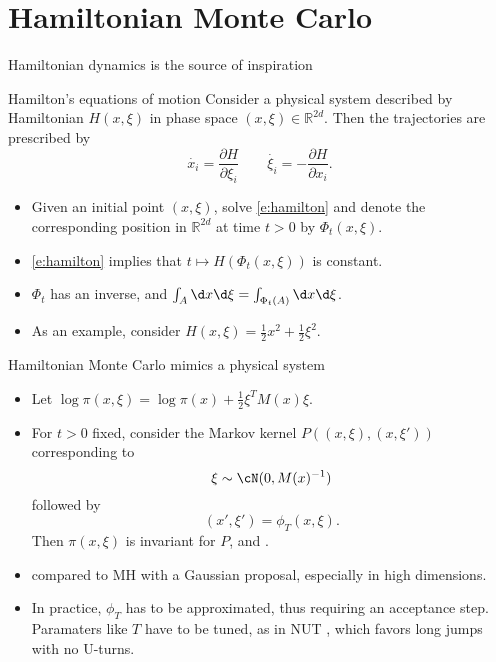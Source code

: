 \documentclass[10pt]{beamer}
\begin{document}
\section{Hamiltonian Monte Carlo}
\begin{frame}{Hamiltonian dynamics is the source of inspiration}
\begin{block}{Hamilton's equations of motion}
Consider a physical system described by Hamiltonian $H(x,\xi)$ in phase space $(x,\xi)\in \mathbb{R}^{2d}$. Then the trajectories are prescribed by
\begin{equation}
  \label{e:hamilton}
  \dot{x_i} = \frac{\partial H}{\partial \xi_i} \qquad \dot{\xi_i} = -\frac{\partial H}{\partial x_i}.
\end{equation}
\end{block}
\begin{itemize}
  \item Given an initial point $(x,\xi)$, solve \eqref{e:hamilton} and denote the corresponding position in $\mathbb{R}^{2d}$ at time $t>0$ by $\Phi_t(x,\xi)$.
  \item \eqref{e:hamilton} implies that $t\mapsto H(\Phi_t(x,\xi))$ is constant.
  \item $\Phi_t$ has an inverse, and $\int_A \d x\d \xi = \int_{\Phi_t(A)} \d x\d \xi$.
  \item As an example, consider $H(x,\xi) = \frac12 x^2 + \frac12 \xi^2.$
\end{itemize}
\blank
\end{frame}

\begin{frame}{Hamiltonian Monte Carlo mimics a physical system}
  \begin{itemize}
    \item Let $\log \pi(x, \xi) =  \log \pi(x) + \frac12 \xi^T M(x) \xi$.
    \item For $t>0$ fixed, consider the Markov kernel $P((x,\xi), (x,\xi'))$ corresponding to
    $$ \xi\sim \cN(0,M(x)^{-1})$$
    followed  by
    $$(x',\xi') = \phi_T(x,\xi).$$
    Then $\pi(x,\xi)$ is invariant for $P$, and .
    \vspace{2.5cm}
    \item {} compared to MH with a Gaussian proposal, especially in high dimensions.
    \item In practice, $\phi_T$ has to be approximated, thus requiring an acceptance step. Paramaters like $T$ have to be tuned, as in NUT \citep{HoGe14}, which favors long jumps with no U-turns.
\end{itemize}
\end{frame}
\end{document}
